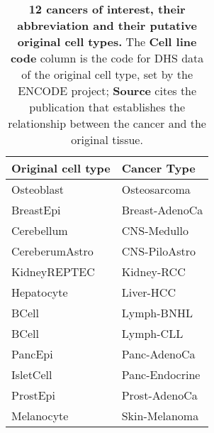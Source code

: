 \begin{table}[hp!]
\centering
\caption{\textbf{12 cancers of interest, their abbreviation and their putative original cell types.} The \textbf{Cell line code} column is the code for DHS data of the original cell type, set by the ENCODE project; \textbf{Source} cites the publication that establishes the relationship between the cancer and the original tissue.}
\label{tab:encode_pca}
\begin{tabulary}{\textwidth}{ ll }
\toprule
\textbf{Original cell type} & \bf{Cancer Type}  \\
\toprule
Osteoblast & Osteosarcoma \\

BreastEpi & Breast-AdenoCa \\

Cerebellum &  CNS-Medullo  \\

CereberumAstro & CNS-PiloAstro \\

KidneyREPTEC & Kidney-RCC \\

Hepatocyte & Liver-HCC \\

BCell & Lymph-BNHL \\

BCell & Lymph-CLL \\

PancEpi & Panc-AdenoCa \\

IsletCell & Panc-Endocrine \\

ProstEpi & Prost-AdenoCa \\

Melanocyte & Skin-Melanoma \\
\bottomrule

\end{tabulary}
\end{table}

